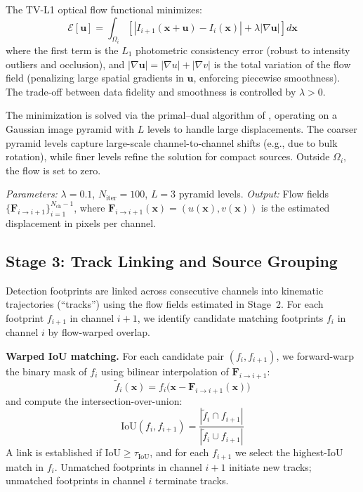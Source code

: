 \documentclass{aa}
\begin{document}
The TV-L1 optical flow functional \citep{Zach2007,Wedel2009} minimizes:
\begin{equation}
  \mathcal{E}[\mathbf{u}] = \int_{\Omega_i} \left[ \left|I_{i+1}(\mathbf{x} + \mathbf{u}) - I_i(\mathbf{x})\right| + \lambda \left|\nabla \mathbf{u}\right| \right] d\mathbf{x}
\end{equation}
where the first term is the $L_1$ photometric consistency error (robust to intensity outliers and occlusion), and $|\nabla \mathbf{u}| = |\nabla u| + |\nabla v|$ is the total variation of the flow field (penalizing large spatial gradients in $\mathbf{u}$, enforcing piecewise smoothness). The trade-off between data fidelity and smoothness is controlled by $\lambda > 0$.

The minimization is solved via the primal--dual algorithm of \citet{Chambolle+Pock2011}, operating on a Gaussian image pyramid with $L$ levels to handle large displacements. The coarser pyramid levels capture large-scale channel-to-channel shifts (e.g., due to bulk rotation), while finer levels refine the solution for compact sources. Outside $\Omega_i$, the flow is set to zero.

\textit{Parameters:} $\lambda = 0.1$, $N_{\mathrm{iter}} = 100$, $L = 3$ pyramid levels. \textit{Output:} Flow fields $\{\mathbf{F}_{i \to i+1}\}_{i=1}^{N_{\mathrm{ch}}-1}$, where $\mathbf{F}_{i \to i+1}(\mathbf{x}) = (u(\mathbf{x}), v(\mathbf{x}))$ is the estimated displacement in pixels per channel.

\subsection{Stage 3: Track Linking and Source Grouping}
\label{sec:method_linking}

Detection footprints are linked across consecutive channels into kinematic trajectories (``tracks'') using the flow fields estimated in Stage~2. For each footprint $f_{i+1}$ in channel $i+1$, we identify candidate matching footprints $f_i$ in channel $i$ by flow-warped overlap.

\textbf{Warped IoU matching.} For each candidate pair $(f_i, f_{i+1})$, we forward-warp the binary mask of $f_i$ using bilinear interpolation of $\mathbf{F}_{i \to i+1}$:
\begin{equation}
  \tilde{f}_i(\mathbf{x}) = f_i\bigl(\mathbf{x} - \mathbf{F}_{i \to i+1}(\mathbf{x})\bigr)
\end{equation}
and compute the intersection-over-union:
\begin{equation}
  \mathrm{IoU}(f_i, f_{i+1}) = \frac{|\tilde{f}_i \cap f_{i+1}|}{|\tilde{f}_i \cup f_{i+1}|}
\end{equation}
A link is established if $\mathrm{IoU} \geq \tau_{\mathrm{IoU}}$, and for each $f_{i+1}$ we select the highest-IoU match in $f_i$. Unmatched footprints in channel $i+1$ initiate new tracks; unmatched footprints in channel $i$ terminate tracks.
\end{document}
